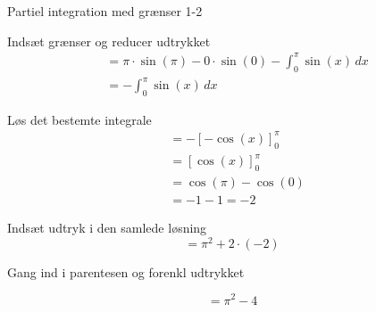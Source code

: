 \documentclass{article}
\begin{document}
\begin{exercise}{Partiel integration med grænser 1-2}
	\hint 
	
	Indsæt grænser og reducer udtrykket
	\begin{align*}
	&= \pi \cdot \sin(\pi) - 0 \cdot \sin(0) - \int_0^\pi \sin(x) \,dx  \\
	&= - \int_0^\pi \sin(x) \, dx
	\end{align*}
	
	\hint 
	
	Løs det bestemte integrale
	\begin{align*}
	&= -\left[ -  \cos(x) \right]_0^\pi  \\
	&= \left[ \cos(x) \right]_0^\pi \\
	&= \cos(\pi) - \cos(0) \\
	&= -1 - 1 = -2
	\end{align*}

	
	
	\hint
	Indsæt udtryk i den samlede løsning
	\[
	= \pi^2 + 2 \cdot ( -2 )
	\]
	
	\hint
	Gang ind i parentesen og forenkl udtrykket
	
	\hint
	\[
	= \pi ^2 - 4
	\]
	
	
	
\end{exercise}

\newpage
\end{document}
